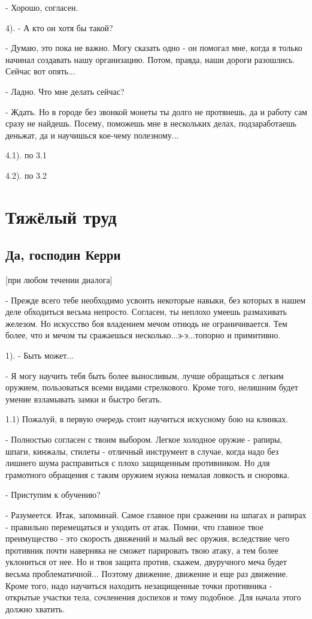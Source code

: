 \documentclass[12pt,a4paper]{book}
\begin{document}
- Хорошо, согласен.

4). - А кто он хотя бы такой? 

-  Думаю, это пока не важно. Могу сказать одно - он помогал мне, когда я только начинал создавать нашу организацию. Потом, правда, наши дороги разошлись. Сейчас вот опять...

- Ладно. Что мне делать сейчас?

- Ждать. Но в городе без звонкой монеты ты долго не протянешь, да и работу сам сразу не найдешь. Посему, поможешь мне в нескольких делах, подзаработаешь деньжат, да и научишься кое-чему полезному...

4.1). по 3.1

4.2). по 3.2

\chapter{Тяжёлый труд}

\section{Да, господин Керри}

[при любом течении диалога]

- Прежде всего тебе необходимо усвоить некоторые навыки, без которых в нашем деле обходиться весьма непросто. Согласен, ты неплохо умеешь размахивать железом. Но искусство боя владением мечом отнюдь не ограничивается. Тем более, что и мечом ты сражаешься несколько...э-э...топорно и примитивно. 

1). - Быть может...

- Я могу научить тебя быть более выносливым, лучше обращаться с легким оружием, пользоваться всеми видами стрелкового. Кроме того, нелишним будет умение взламывать замки и быстро бегать.

1.1) Пожалуй, в первую очередь стоит научиться искусному бою на клинках.

- Полностью согласен с твоим выбором. Легкое холодное оружие - рапиры, шпаги, кинжалы, стилеты - отличный инструмент в случае, когда надо без лишнего шума расправиться с плохо защищенным противником. Но для грамотного обращения с таким оружием нужна немалая ловкость и сноровка.

- Приступим к обучению?

- Разумеется. Итак, запоминай. Самое главное при сражении на шпагах и рапирах - правильно перемещаться и уходить от атак. Помни, что главное твое преимущество - это скорость движений и малый вес оружия, вследствие чего противник почти наверняка не сможет парировать твою атаку, а тем более уклониться от нее. Но и твоя защита против, скажем, двуручного меча будет весьма проблематичной... Поэтому движение, движение и еще раз движение. Кроме того, надо научиться находить незащищенные точки противника - открытые участки тела, сочленения доспехов и тому подобное. Для начала этого должно хватить.
\end{document}
